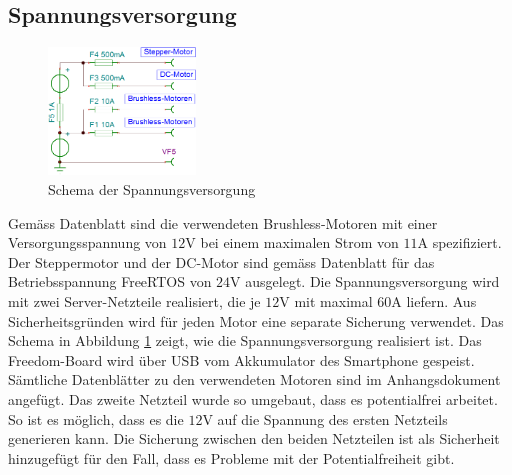     \subsection{Spannungsversorgung}       
        \begin{figure}
           	\includegraphics[width=0.35\textwidth,clip,trim=0mm 0.5mm 0mm 0mm]
           	{Enddokumentation/Bilder/BeschaltungNetzteile.png}
           	\centering
           	\caption{Schema der Spannungsversorgung} 
           	\label{abb:Spannungsversorgung}
        \end{figure}
        Gemäss Datenblatt sind die verwendeten Brushless-Motoren mit einer Versorgungsspannung 
        von $12\si{\volt}$ bei einem maximalen Strom von $11\si{\ampere}$ spezifiziert. 
        Der Steppermotor und der DC-Motor sind gemäss Datenblatt für das Betriebsspannung FreeRTOS 
        von $24\si{\volt}$ ausgelegt. Die Spannungsversorgung wird mit zwei Server-Netzteile 
        realisiert, die je $12\si{\volt}$ mit maximal $60\si{\ampere}$ liefern. Aus 
        Sicherheitsgründen wird für jeden Motor eine separate Sicherung verwendet. Das Schema 
        in Abbildung \ref{abb:Spannungsversorgung} zeigt, wie die Spannungsversorgung 
        realisiert ist. Das Freedom-Board wird über USB vom Akkumulator des Smartphone 
        gespeist. Sämtliche Datenblätter zu den verwendeten Motoren sind im Anhangsdokument 
        angefügt. Das zweite Netzteil wurde so umgebaut, dass es potentialfrei arbeitet. So 
        ist es möglich, dass es die $12\si{\volt}$ auf die Spannung des ersten Netzteils 
        generieren kann. Die Sicherung zwischen den beiden Netzteilen ist als Sicherheit 
        hinzugefügt für den Fall, dass es Probleme mit der Potentialfreiheit gibt.	